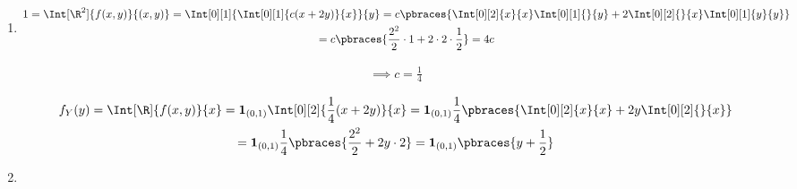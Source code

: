 \begin{solution}

\phantom{}

\begin{enumerate}[label = (\alph*)]

    \item

    \begin{multline*}
        1
        =
        \Int[\R^2]{f(x, y)}{(x, y)}
        =
        \Int[0][1]
        {
            \Int[0][1]
            {
                c (x + 2 y)
            }{x}
        }{y}
        =
        c
        \pbraces
        {
            \Int[0][2]{x}{x} \Int[0][1]{}{y}
            +
            2 \Int[0][2]{}{x} \Int[0][1]{y}{y}
        } \\
        =
        c
        \pbraces
        {
            \frac{2^2}{2} \cdot 1 + 2 \cdot 2 \cdot \frac{1}{2}
        }
        =
        4 c
    \end{multline*}

    \begin{align*}
        \implies c = \frac{1}{4}
    \end{align*}

    \begin{multline*}
        f_Y(y)
        =
        \Int[\R]{f(x, y)}{x}
        =
        \mathbf 1_{(0, 1)} \Int[0][2]{\frac{1}{4} (x + 2 y)}{x}
        =
        \mathbf 1_{(0, 1)}
        \frac{1}{4}
        \pbraces
        {
            \Int[0][2]{x}{x}
            +
            2 y \Int[0][2]{}{x}
        } \\
        =
        \mathbf 1_{(0, 1)}
        \frac{1}{4}
        \pbraces
        {
            \frac{2^2}{2}
            +
            2 y \cdot 2
        }
        =
        \mathbf 1_{(0, 1)}
        \pbraces{y + \frac{1}{2}}
    \end{multline*}

    \item


\end{enumerate}
\end{solution}
